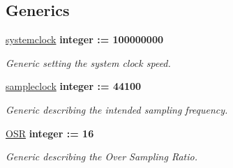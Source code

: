 \subsection*{Generics}
 \begin{DoxyCompactItemize}
\item 
\hypertarget{classclk__divide_a81d31886de4b5afc05873543265dcf7c}{\hyperlink{classclk__divide_a81d31886de4b5afc05873543265dcf7c}{systemclock} {\bfseries {\bfseries \textcolor{comment}{integer}\textcolor{vhdlchar}{ }\textcolor{vhdlchar}{\-:}\textcolor{vhdlchar}{=}\textcolor{vhdlchar}{ } \textcolor{vhdldigit}{100000000} \textcolor{vhdlchar}{ }}}}\label{classclk__divide_a81d31886de4b5afc05873543265dcf7c}

\begin{DoxyCompactList}\small\item\em Generic setting the system clock speed. \end{DoxyCompactList}\item 
\hypertarget{classclk__divide_a046b87df8ce0a99f5bacf19e5027cccf}{\hyperlink{classclk__divide_a046b87df8ce0a99f5bacf19e5027cccf}{sampleclock} {\bfseries {\bfseries \textcolor{comment}{integer}\textcolor{vhdlchar}{ }\textcolor{vhdlchar}{\-:}\textcolor{vhdlchar}{=}\textcolor{vhdlchar}{ } \textcolor{vhdldigit}{44100} \textcolor{vhdlchar}{ }}}}\label{classclk__divide_a046b87df8ce0a99f5bacf19e5027cccf}

\begin{DoxyCompactList}\small\item\em Generic describing the intended sampling frequency. \end{DoxyCompactList}\item 
\hypertarget{classclk__divide_aeab4f828c7bc0927792f6a9c6bf1b63f}{\hyperlink{classclk__divide_aeab4f828c7bc0927792f6a9c6bf1b63f}{O\-S\-R} {\bfseries {\bfseries \textcolor{comment}{integer}\textcolor{vhdlchar}{ }\textcolor{vhdlchar}{\-:}\textcolor{vhdlchar}{=}\textcolor{vhdlchar}{ } \textcolor{vhdldigit}{16} \textcolor{vhdlchar}{ }}}}\label{classclk__divide_aeab4f828c7bc0927792f6a9c6bf1b63f}

\begin{DoxyCompactList}\small\item\em Generic describing the Over Sampling Ratio. \end{DoxyCompactList}\end{DoxyCompactItemize}
